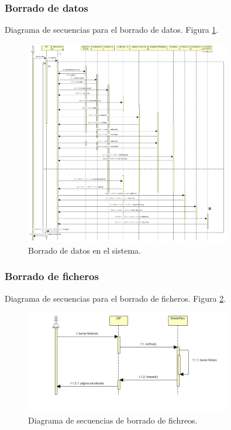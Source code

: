 \subsubsection{Borrado de datos}
Diagrama de secuencias para el borrado de datos. Figura \ref{borradodatos}.
\begin{figure}[!htbp]
  \centering
    \includegraphics[width=0.8\textwidth]{../img/diagramas/secuencias/2.jpg}
  \caption{Borrado de datos en el sistema.}
  \label{borradodatos}
\end{figure}

\subsubsection{Borrado de ficheros}
Diagrama de secuencias para el borrado de ficheros. Figura \ref{borradoficheros}.
\begin{figure}[!htbp]
  \centering
    \includegraphics[width=0.8\textwidth]{../img/diagramas/secuencias/1.jpg}
  \caption{Diagrama de secuencias de borrado de fichreos.}
  \label{borradoficheros}
\end{figure}


